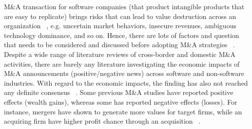 \documentclass[preprint,10pt]{elsarticle}
\begin{document}

M\&A transaction for software companies (that product intangible products that are easy to replicate) brings risks that can lead to value destruction across an organization ~\cite{Pezzi}, e.g. uncertain market behaviors, insecure revenues, ambiguous technology dominance, and so on. Hence, there are lots of factors and question that needs to be considered and discussed before adopting M\&A strategies ~\cite{Andriuskevicius}. Despite a wide range of literature reviews of cross-border and domestic M\&A activities, there are barely any literature investigating the economic impacts of M\&A announcements (positive/negative news) across software and non-software industries. With regard to the economic impacts, the finding has also not reached any definite consensus ~\cite{Thathaiah}. Some previous M\&A studies have reported positive effects (wealth gains), whereas some has reported negative effects (losses). For instance, mergers have shown to generate more values for target firms, while an acquiring firm have higher profit chance through an acquisition ~\cite{kashiramka2014shareholders}. 
 

\end{document}
